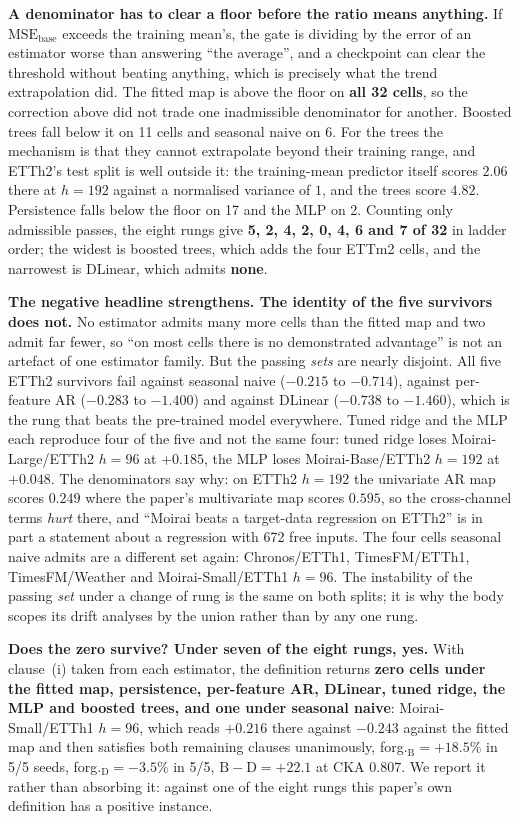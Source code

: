 \textbf{A denominator has to clear a floor before the ratio means anything.}  If
$\text{MSE}_\text{base}$ exceeds the training mean's, the gate is dividing by the
error of an estimator worse than answering ``the average'', and a checkpoint can
clear the threshold without beating anything, which is precisely what the trend
extrapolation did.  The fitted map is above the floor on \textbf{all 32 cells},
so the correction above did not trade one inadmissible denominator for another.
Boosted trees fall below it on 11 cells and seasonal naive on 6.  For the trees
the mechanism is that they cannot extrapolate beyond their training range, and
ETTh2's test split is well outside it: the training-mean predictor itself scores
$2.06$ there at $h{=}192$ against a normalised variance of $1$, and the trees
score $4.82$.  Persistence falls below the floor on 17 and the MLP on 2.
Counting only admissible passes, the eight rungs give \textbf{5, 2, 4, 2, 0, 4, 6
and 7 of 32} in ladder order; the widest is boosted trees, which adds the four
ETTm2 cells, and the narrowest is DLinear, which admits \textbf{none}.

\textbf{The negative headline strengthens.  The identity of the five survivors
does not.}  No estimator admits many more cells than the fitted map and two admit
far fewer, so ``on most cells there is no demonstrated advantage'' is not an
artefact of one estimator family.  But the passing \emph{sets} are nearly
disjoint.  All five ETTh2 survivors fail against seasonal naive ($-0.215$ to
$-0.714$), against per-feature AR ($-0.283$ to $-1.400$) and against DLinear
($-0.738$ to $-1.460$), which is the rung that beats the pre-trained model
everywhere.  Tuned ridge and the MLP each reproduce four of the five and not the
same four: tuned ridge loses Moirai-Large/ETTh2 $h{=}96$ at $+0.185$, the MLP
loses Moirai-Base/ETTh2 $h{=}192$ at $+0.048$.  The
denominators say why: on ETTh2 $h{=}192$ the univariate AR map scores $0.249$
where the paper's multivariate map scores $0.595$, so the cross-channel terms
\emph{hurt} there, and ``Moirai beats a target-data regression on ETTh2'' is in
part a statement about a regression with 672 free inputs.  The four cells
seasonal naive admits are a different set again: Chronos/ETTh1, TimesFM/ETTh1,
TimesFM/Weather and Moirai-Small/ETTh1 $h{=}96$.  The instability of the passing
\emph{set} under a change of rung is the same on both splits; it is why the body
scopes its drift analyses by the union rather than by any one rung.

\textbf{Does the zero survive?  Under seven of the eight rungs, yes.}  With
clause~(i) taken from each estimator, the definition returns \textbf{zero cells
under the fitted map, persistence, per-feature AR, DLinear, tuned ridge, the MLP
and boosted trees, and one under seasonal naive}: Moirai-Small/ETTh1 $h{=}96$, which reads $+0.216$ there
against $-0.243$ against the fitted map and then satisfies both remaining clauses
unanimously, forg.$_\text{B}{=}{+}18.5\%$ in 5/5 seeds,
forg.$_\text{D}{=}{-}3.5\%$ in 5/5, $\text{B}{-}\text{D}{=}{+}22.1$ at CKA
$0.807$.  We report it rather than absorbing it: against one of the eight rungs
this paper's own definition has a positive instance.

